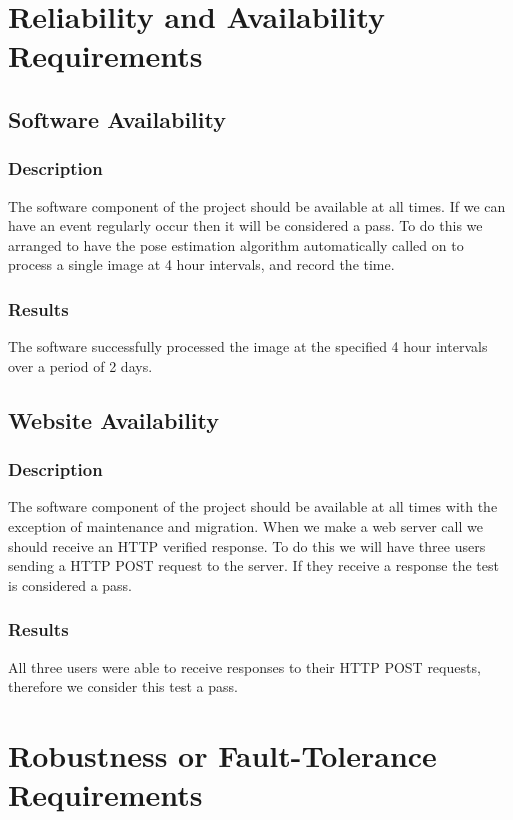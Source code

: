 \documentclass{scrreprt}
\begin{document}
\section{Reliability and Availability Requirements}
\subsection{Software Availability}
\subsubsection{Description}

The software component of the project should be available at all times. If we
can have an event regularly occur then it will be considered a pass. To do this
we arranged to have the pose estimation algorithm automatically called on to
process a single image at 4 hour intervals, and record the time.

\subsubsection{Results}

The software successfully processed the image at the specified 4 hour intervals
over a period of 2 days.

\subsection{Website Availability}
\subsubsection{Description}

The software component of the project should be available at all times with the
exception of maintenance and migration. When we make a web server call we should
receive an HTTP verified response. To do this we will have three users sending
a HTTP POST request to the server. If they receive a response the test is
considered a pass.

\subsubsection{Results}

All three users were able to receive responses to their HTTP POST requests,
therefore we consider this test a pass.

\section{Robustness or Fault-Tolerance Requirements}
\end{document}
